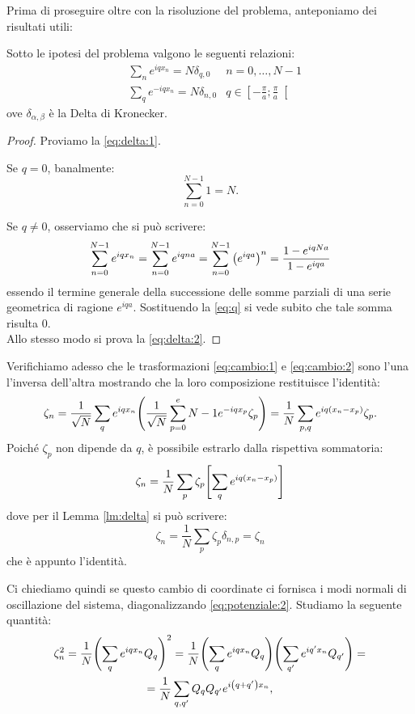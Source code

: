         \par Prima di proseguire oltre con la risoluzione del problema, anteponiamo dei risultati utili:
        \begin{lemma} \label{lm:delta}
            Sotto le ipotesi del problema valgono le seguenti relazioni:
            \begin{align}
                &\sum_{n}e^{iqx_n}=N\delta_{q,0} &n=0,\dots,N-1 \label{eq:delta:1}\\
                &\sum_{q}e^{-iqx_n}=N\delta_{n,0} &q\in\left[-\frac{\pi}{a};\frac{\pi}{a}\right[ \label{eq:delta:2}
            \end{align}
        ove $\delta_{\alpha,\beta}$ \`e la Delta di Kronecker.
        \end{lemma}
        \begin{proof}
            Proviamo la \eqref{eq:delta:1}. \par Se $q=0$, banalmente: $$\sum_{n=0}^{N-1}1=N.$$ \par Se $q\neq0$, osserviamo che si pu\`o scrivere: $$\sum_{n=0}^{N-1} e^{iqx_n}=\sum_{n=0}^{N-1} e^{iqna}=\sum_{n=0}^{N-1}\qty(e^{iqa})^n=\frac{1-e^{iqNa}}{1-e^{iqa}}$$ essendo il termine generale della successione delle somme parziali di una serie geometrica di ragione $e^{iqa}$. Sostituendo la \eqref{eq:q} si vede subito che tale somma risulta $0$. \\ Allo stesso modo si prova la \eqref{eq:delta:2}.
        \end{proof}
        \par Verifichiamo adesso che le trasformazioni \eqref{eq:cambio:1} e \eqref{eq:cambio:2} sono l'una l'inversa dell'altra mostrando che la loro composizione restituisce l'identit\`a: $$\zeta_n=\frac{1}{\sqrt{N}}\sum_{q}e^{iqx_n}\qty(\frac{1}{\sqrt{N}}\sum_{p=0}^e{N-1}e^{-iqx_p}\zeta_p)=\frac{1}{N}\sum_{p,q}e^{iq\qty(x_n-x_p)}\zeta_p.$$ Poich\'e $\zeta_p$ non dipende da $q$, \`e possibile estrarlo dalla rispettiva sommatoria: $$\zeta_n=\frac{1}{N}\sum_p\zeta_p\qty[\sum_q e^{iq\qty(x_n-x_p)}]$$ dove per il Lemma \ref{lm:delta} si pu\`o scrivere: $$\zeta_n=\frac{1}{N}\sum_p\zeta_p\delta_{n,p}=\zeta_n$$ che \`e appunto l'identit\`a. \par Ci chiediamo quindi se questo cambio di coordinate ci fornisca i modi normali di oscillazione del sistema, diagonalizzando \eqref{eq:potenziale:2}. Studiamo la seguente quantit\`a:
        \begin{multline*}
            \zeta_n^2=\frac{1}{N}\qty(\sum_q e^{iqx_n}Q_q)^2=\frac{1}{N}\qty(\sum_q e^{iqx_n}Q_q)\Biggl(\sum_{q'} e^{iq'x_n}Q_{q'}\Biggr)=\\=\frac{1}{N}\sum_{q,q'}Q_qQ_{q'}e^{i\qty(q+q')x_n},
        \end{multline*}
